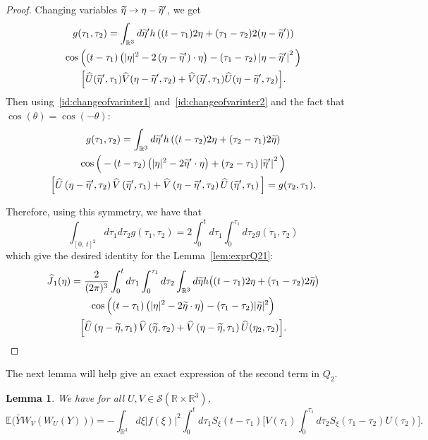 \documentclass[10pt]{amsart}
\newtheorem{lemm}[theo]{Lemma}\newtheorem{prop}[theo]{Proposition}\newtheorem{coro}[theo]{Corollary}\newtheorem{conj}[theo]{Conjecture}
\theoremstyle{definition}\newtheorem{defi}[theo]{Definition}\newtheorem{rema}[theo]{Remark}\newtheorem{exam}[theo]{Example}\newtheorem{exem}[theo]{Example}\newtheorem{nota}[theo]{Notation}
\newcommand{\R}{\mathbb{R}}
\newcommand{\E}{\mathbb{E}}
\newcommand{\mclS}{\mathcal{S}}
\let\oldtilde\tilde
\renewcommand*{\tilde}[1]{\mathchoice{\widetilde{#1}}{\widetilde{#1}}{\oldtilde{#1}}{\oldtilde{#1}}}
\let\oldhat\hat
\renewcommand*{\hat}[1]{\mathchoice{\widehat{#1}}{\widehat{#1}}{\oldhat{#1}}{\oldhat{#1}}}
\begin{document}
\begin{proof}
Changing variables $\tilde \eta \rightarrow \eta-\tilde \eta'$, we get
\begin{multline*}
g(\tau_1,\tau_2) = 
\int_{\R^3} d\tilde{\eta}' h\left((t-\tau_1)2\eta + (\tau_1-\tau_2) 2(\eta-\tilde{\eta}')\right)\\ \cos\Big((t-\tau_1)\left(|\eta|^2-2\left(\eta-\tilde{\eta}'\right)\cdot \eta\right)-(\tau_1-\tau_2)\left|\eta-\tilde{\eta}'\right|^2 \Big)\\
\Big[\hat U(\tilde{\eta}',\tau_1) \hat V(\eta-\tilde{\eta}',\tau_2)+ \hat V(\tilde{\eta}',\tau_1) \hat U(\eta-\tilde{\eta}',\tau_2)\Big].
\end{multline*}
Then using~\eqref{id:changeofvarinter1} and~\eqref{id:changeofvarinter2} and the fact that $\cos (\theta)=\cos(-\theta)$:
\begin{multline*}
g(\tau_1,\tau_2) = \int_{\R^3} d\tilde{\eta}' h\left((t-\tau_2)2\eta + (\tau_2-\tau_1) 2\tilde{\eta}\right)\\
\cos\Big(-(t-\tau_2)\left(|\eta|^2-2\tilde{\eta}'\cdot \eta\right)+(\tau_2-\tau_1)\left|\tilde{\eta}'\right|^2 \Big)\\
\Big[\hat U\left(\eta-\tilde{\eta}',\tau_2\right) \hat V\left(\tilde{\eta}',\tau_1\right)+ \hat V\left(\eta-\tilde{\eta}',\tau_2\right) \hat U\left(\tilde{\eta}',\tau_1\right)\Big]
=g(\tau_2,\tau_1).
\end{multline*}

Therefore, using this symmetry, we have that
\[
\int_{[0,\,t]^2}d\tau_1d\tau_2 g(\tau_1,\tau_2)=2\int_0^td\tau_1\int_0^{\tau_1}d\tau_2 g(\tau_1,\tau_2)
\]
which give the desired identity for the Lemma~\ref{lem:exprQ21}:
\begin{multline*}
\hat J_1(\eta) =
 \frac{2}{(2\pi)^3}\int_{0}^td\tau_1 \int_{0}^{\tau_1}d\tau_2 \int_{\R^3} d\tilde{\eta} h\big((t-\tau_1)2\eta + (\tau_1-\tau_2) 2\tilde{\eta}\big)\\
 \cos\Big((t-\tau_1)\left(|\eta|^2-2\tilde{\eta}\cdot \eta\right)-(\tau_1-\tau_2)|\tilde{\eta}|^2 \Big)\\
\Big[\hat U\left(\eta-\tilde{\eta},\tau_1\right) \hat V\left(\tilde{\eta},\tau_2\right)+ \hat V\left(\eta-\tilde{\eta},\tau_1\right) \hat U(\eta_2,\tau_2)\Big].
\end{multline*}
\end{proof}


The next lemma will help give an exact expression of the second term in $Q_2$.


\begin{lemm}\label{lem:expressionWVWU}
We have for all $U,V \in \mclS(\R\times \R^3)$,
\[
\E\Big(\bar Y W_V\left(W_U(Y)\right)\Big) = - \int_{\R^3} d\xi |f(\xi)|^2 \int_{0}^t d\tau_1 S_\xi (t-\tau_1)\Big[V(\tau_1) \int_{0}^{\tau_1} d\tau_2 S_\xi (\tau_1 - \tau_2) U (\tau_2) \Big].
\]
\end{lemm}
\end{document}
